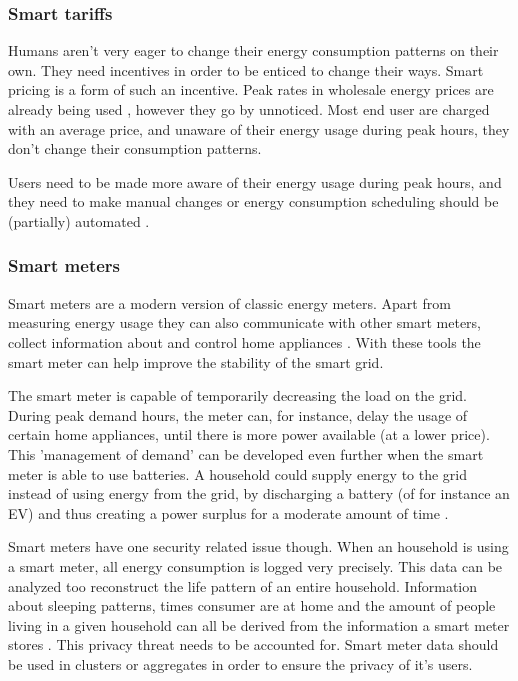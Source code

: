\subsubsection{Smart tariffs}

Humans aren’t very eager to change their energy consumption patterns on their own. They need incentives in order to be enticed to change their ways. Smart pricing is a form of such an incentive. Peak rates in wholesale energy prices are already being used \cite{SamadiMohsenian-RadSchoberEtAl2012}, however they go by unnoticed. Most end user are charged with an average price, and unaware of their energy usage during peak hours, they don’t change their consumption patterns. 

Users need to be made more aware of their energy usage during peak hours, and they need to make manual changes \cite{Mohsenian-RadLeon-Garcia2010} or energy consumption scheduling should be (partially) automated  \cite{SamadiMohsenian-RadSchoberEtAl2012}.

\subsubsection{Smart meters}

Smart meters are a modern version of classic energy meters. Apart from measuring energy usage they can also communicate with other smart meters, collect information about and control home appliances \cite{DepuruWangDevabhaktuni2011a}. With these tools the smart meter can help improve the stability of the smart grid.

The smart meter is capable of temporarily decreasing the load on the grid. During peak demand hours, the meter can, for instance, delay the usage of certain home appliances, until there is more power available (at a lower price). 
This 'management of demand' can be developed even further when the smart meter is able to use batteries. A household could supply energy to the grid instead of using energy from the grid, by discharging a battery (of for instance an EV) and thus creating a power surplus for a moderate amount of time \cite{MwasiluJustoKimEtAl2014}. 

Smart meters have one security related issue though. When an household is using a smart meter, all energy consumption is logged very precisely. This data can be analyzed too reconstruct the life pattern of an entire household. Information about sleeping patterns, times consumer are at home and the amount of people living in a given household can all be derived from the information a smart meter stores \cite{Molina-MarkhamShenoyFuEtAl2010}. This privacy threat needs to be accounted for. Smart meter data should be used in clusters or aggregates in order to ensure the privacy of it's users.

